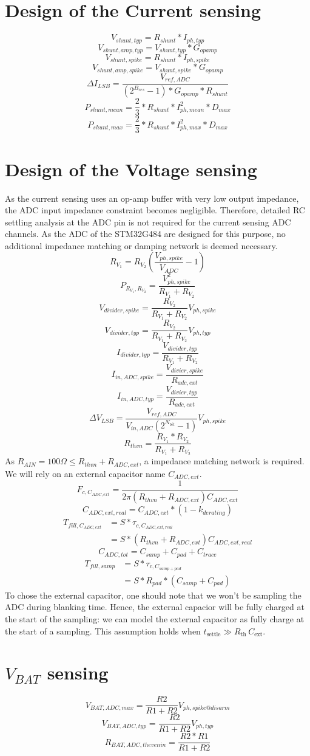 \documentclass[a4paper, 10pt, conference]{IEEEtran} %
\begin{document}
 
\section{Design of the Current sensing}

\[
V_{shunt,typ} = R_{shunt} * I_{ph,typ}
\]
\[
V_{shunt,amp,typ} = V_{shunt,typ}*G_{opamp}
\]
\[
V_{shunt,spike} = R_{shunt} * I_{ph,spike}
\]
\[
V_{shunt,amp,spike} = V_{shunt,spike}*G_{opamp}
\]
\[
\Delta I_{LSB} = \frac{V_{ref,ADC}}{(2^{B_{res}}-1)*G_{opamp}*R_{shunt}}
\]
\[
P_{shunt,mean} = \frac{2}{3} * R_{shunt} * I_{ph,mean}^2 * D_{max}
\]
\[
P_{shunt,max} = \frac{2}{3} * R_{shunt} * I_{ph,max}^2 * D_{max}
\]

\section{Design of the Voltage sensing}

As the current sensing uses an op-amp buffer with very low output impedance, the ADC input impedance constraint becomes negligible. Therefore, detailed RC settling analysis at the ADC pin is not required for the current sensing ADC channels. As the ADC of the STM32G484 are designed for this purpose, no additional impedance matching or damping network is deemed necessary.
\[
R_{V_1} = R_{V_2}(\frac{V_{ph,spike}}{V_{ADC}} - 1)
\]
\[
P_{R_{V_1},R_{V_2}} = \frac{V_{ph,spike}^2}{R_{V_1}+R_{V_2}}
\]
\[
V_{divider,spike} = \frac{R_{V_2}}{R_{V_1}+R_{V_2}} V_{ph,spike}
\]
\[
V_{divider,typ} = \frac{R_{V_2}}{R_{V_1}+R_{V_2}} V_{ph,typ}
\]
\[
I_{divider,typ} = \frac{V_{divider,typ}}{R_{V_1}+R_{V_2}}
\]
\[
I_{in,ADC,spike} = \frac{V_{divier,spike}}{R_{adc,ext}}
\]
\[
I_{in,ADC,typ} = \frac{V_{divier,typ}}{R_{adc,ext}}
\]
\[
\Delta V_{LSB} = \frac{V_{ref,ADC}}{V_{in,ADC}(2^{N_{bit}}-1)}V_{ph,spike}
\]
\[
R_{thvn} = \frac{R_{V_1}*R_{V_2}}{R_{V_1}+R_{V_2}}
\]
As $R_{AIN} = 100\Omega \le R_{thvn}+R_{ADC,ext}$, a impedance matching network is required. We will rely on an external capacitor name $C_{ADC,ext}$.
\[
F_{c,C_{ADC,ext}} = \frac{1}{2\pi (R_{thvn}+R_{ADC,ext})C_{ADC,ext}}
\]
\[
C_{ADC,ext,real} = C_{ADC,ext}*(1-k_{derating})
\]
\[
\begin{aligned}
T_{fill,C_{ADC,ext}} &= S*\tau_{c,C_{ADC,ext,real}} \\
&= S*(R_{thvn}+R_{ADC,ext})C_{ADC,ext,real}
\end{aligned}
\]
\[
C_{ADC,tot} = C_{samp} + C_{pad} + C_{trace}
\]
\[
\begin{aligned}
T_{fill,samp} &= S*\tau_{c,C_{samp+pad}} \\
&= S*R_{pad}*(C_{samp}+C_{pad})
\end{aligned}
\]
To chose the external capacitor, one should note that we won't be sampling the ADC during blanking time. Hence, the external capacior will be fully charged at the start of the sampling: we can model the external capacitor as fully charge at the start of a sampling. This assumption holds when $t_{\mathrm{settle}} \gg R_{\mathrm{th}}\,C_{\mathrm{ext}}$.

\section{$V_{BAT}$ sensing}

\[
V_{BAT,ADC,max} = \frac{R2}{R1+R2} V_{ph,spike@disarm}
\]
\[
V_{BAT,ADC,typ} = \frac{R2}{R1+R2} V_{ph,typ}
\]
\[
R_{BAT,ADC,thevenin} = \frac{R2*R1}{R1+R2}
\]
\end{document}
